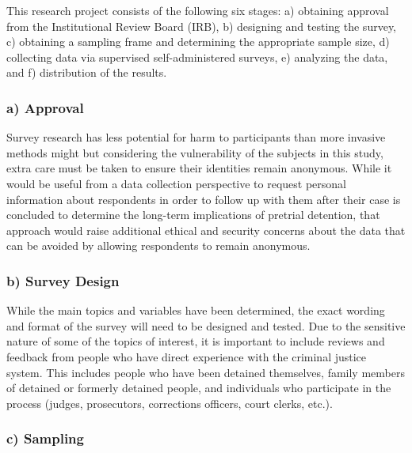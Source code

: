 \documentclass[
  letterpaper,
  DIV=11,
  numbers=noendperiod]{scrartcl}
\begin{document}
This research project consists of the following six stages: a) obtaining
approval from the Institutional Review Board (IRB), b) designing and
testing the survey, c) obtaining a sampling frame and determining the
appropriate sample size, d) collecting data via supervised
self-administered surveys, e) analyzing the data, and f) distribution of
the results.

\hypertarget{a-approval}{%
\subsubsection{a) Approval}\label{a-approval}}

Survey research has less potential for harm to participants than more
invasive methods might but considering the vulnerability of the subjects
in this study, extra care must be taken to ensure their identities
remain anonymous. While it would be useful from a data collection
perspective to request personal information about respondents in order
to follow up with them after their case is concluded to determine the
long-term implications of pretrial detention, that approach would raise
additional ethical and security concerns about the data that can be
avoided by allowing respondents to remain anonymous.

\hypertarget{b-survey-design}{%
\subsubsection{b) Survey Design}\label{b-survey-design}}

While the main topics and variables have been determined, the exact
wording and format of the survey will need to be designed and tested.
Due to the sensitive nature of some of the topics of interest, it is
important to include reviews and feedback from people who have direct
experience with the criminal justice system. This includes people who
have been detained themselves, family members of detained or formerly
detained people, and individuals who participate in the process (judges,
prosecutors, corrections officers, court clerks, etc.).

\hypertarget{c-sampling}{%
\subsubsection{c) Sampling}\label{c-sampling}}
\end{document}
